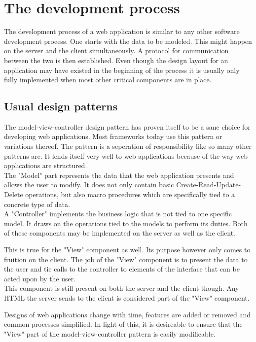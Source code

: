 \documentclass[twoside,11pt,openright]{report}
\begin{document}
\section{The development process}
The development process of a web application is similar to any other
software development process. One starts with the data to be modeled.
This might happen on the server and the client simultaneously.
A protocol for communication between the two is then established.
Even though the design layout for an application may have existed in
the beginning of the process it is usually only fully implemented when
most other critical components are in place.

\subsection{Usual design patterns}
The model-view-controller design pattern has proven itself to be a sane
choice for developing web applications. Most frameworks today use this
pattern or variations thereof.
The pattern is a seperation of responsibility like so many other patterns
are. It lends itself very well to web applications because of the way web
applications are structured.\\
The "Model" part represents the data that the web application presents and
allows the user to modify. It does not only contain basic
Create-Read-Update-Delete operations, but also macro procedures which are
specifically tied to a concrete type of data.\\
A "Controller" implements the business logic that is not tied to one specific
model. It draws on the operations tied to the models to perform its duties.
Both of these components may be implemented on the server as well as the
client.

This is true for the "View" component as well. Its purpose however only comes
to fruition on the client. The job of the "View" component is to present the
data to the user and tie calls to the controller to elements of the interface
that can be acted upon by the user.\\
This component is still present on both the server and the client though. Any
HTML the server sends to the client is considered part of the "View" component.

Designs of web applications change with time, features are added or
removed and common processes simplified. In light of this, it is
desireable to ensure that the "View" part of the model-view-controller
pattern is easily modifieable.
\end{document}
